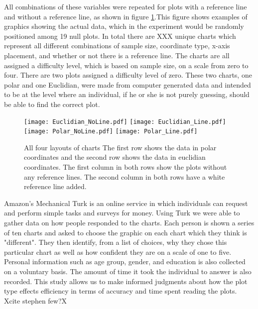  All combinations of these variables were repeated for plots with a reference line and without a reference line, as shown in figure \ref{layouts}.This figure shows examples of graphics showing the actual data, which in the experiment would be randomly positioned among 19 null plots. In total there are XXX unique charts which represent all different combinations of sample size, coordinate type, x-axis placement, and whether or not there is a reference line. The charts are all assigned a difficulty level, which is based on sample size, on a scale from zero to four. There are two plots assigned a difficulty level of zero. These two charts, one polar and one Euclidian, were made from computer generated data and intended to be at the level where an individual, if he or she is not purely guessing, should be able to find the correct plot. 

\begin{figure}[htbp] %
   \centering
   \texttt{[image: Euclidian\_NoLine.pdf]} \hspace{0.05\linewidth}
   \texttt{[image: Euclidian\_Line.pdf]} \\
   \texttt{[image: Polar\_NoLine.pdf]} 
   \texttt{[image: Polar\_Line.pdf]}  
   \caption{All four layouts of charts The first row shows the data in polar coordinates and the second row shows the data in euclidian coordinates. The first column in both rows show the plots without any reference lines. The second column in both rows have a white reference line added. }
   \label{layouts}
\end{figure}

Amazon's Mechanical Turk is an online service in which individuals can request and perform simple tasks and surveys for money. Using Turk we were able to gather data on how people responded to the charts. Each person is shown a series of ten charts and asked to choose the graphic on each chart which they think is "different". They then identify, from a list of choices, why they chose this particular chart as well as how confident they are on a scale of one to five. Personal information such as age group, gender, and education is also collected on a voluntary basis. The amount of time it took the individual to answer is also recorded. This study allows us to make informed judgments about how the plot type effects efficiency in terms of accuracy and time spent reading the plots. Xcite stephen few?X

